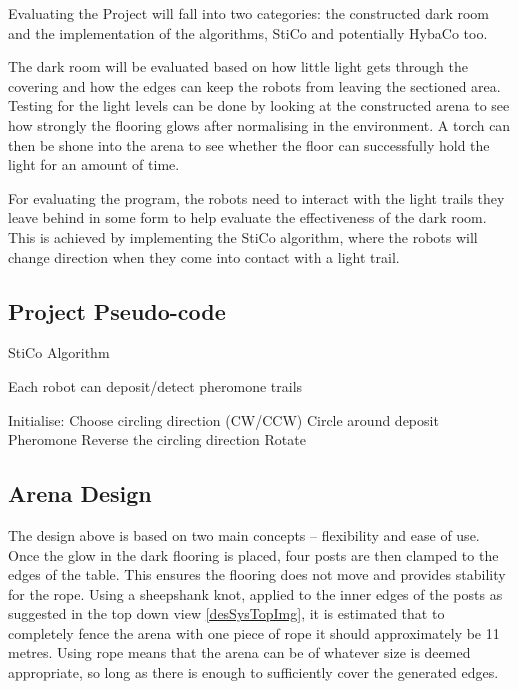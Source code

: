 \label{desSysEval}
Evaluating the Project will fall into two categories:  the constructed dark
room and the implementation of the algorithms, StiCo and potentially HybaCo
too.

The dark room will be evaluated based on how little light gets through the
covering and how the edges can keep the robots from leaving the sectioned area.
Testing for the light levels can be done by looking at the constructed arena to
see how strongly the flooring glows after normalising in the environment.  A 
torch can then be shone into the arena to see whether the floor can successfully
hold the light for an amount of time.

For evaluating the program, the robots need to interact with the light trails
they leave behind in some form to help evaluate the effectiveness of the dark 
room.  This is achieved by implementing the StiCo algorithm, where the robots
will change direction when they come into contact with a light trail.

\subsection{Project Pseudo-code}
\begin{algorithm}
  \caption{StiCo Algorithm\cite{Ranjbar-Sahraei2012Demo} }
  \label{desSysPseuStiCo}
  \begin{algorithmic}[1]
  \Require Each robot can deposit/detect pheromone trails \par
  \State Initialise: Choose circling direction (CW/CCW)
  \Loop
      \State Circle around
      \State deposit Pheromone
    \EndWhile
      \State Reverse the circling direction
    \Else
        \State Rotate
      \EndWhile
    \EndIf
  \EndLoop
  \end{algorithmic}
\end{algorithm}

\subsection{Arena Design}
The design above is based on two main concepts -- flexibility and ease of use.
Once the glow in the dark flooring is placed, four posts are then clamped to the
edges of the table.  This ensures the flooring does not move and provides
stability for the rope.  Using a sheepshank knot, applied to the inner edges of
the posts as suggested in the top down view \ref{desSysTopImg}, it is 
estimated that to completely fence the arena with one piece of rope it should
approximately be 11 metres.  Using rope means that the arena can be of whatever
size is deemed appropriate, so long as there is enough to sufficiently cover the
generated edges.

